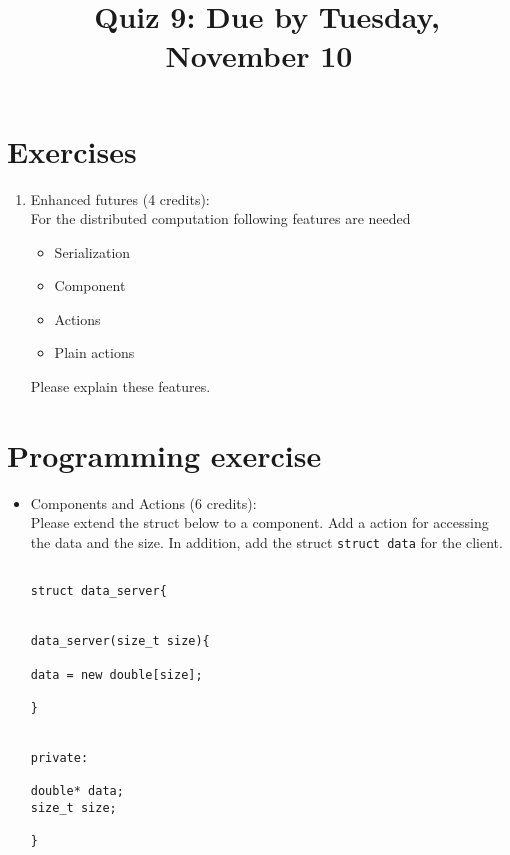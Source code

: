 \documentclass[11pt]{article}
\begin{document}
\title{\coursename~Quiz 9: Due by Tuesday, November 10}
\date{}
\maketitle

\medskip


\section*{Exercises}

\begin{enumerate}
\item Enhanced futures (4 credits): \\
For the distributed computation following features are needed
\begin{itemize}
\item Serialization
\item Component
\item Actions 
\item Plain actions
\end{itemize}
Please explain these features.

\end{enumerate}


\section*{Programming exercise}

\begin{itemize}
\item Components and Actions (6 credits): \\
Please extend the struct below to a component. Add a action for accessing the data and the size. In addition, add the struct \lstinline|struct data| for the client.
\begin{lstlisting}

struct data_server{


data_server(size_t size){

data = new double[size];

}


private:

double* data;
size_t size;

}
\end{lstlisting}

\end{itemize}


\doclicenseThis 
\end{document}
